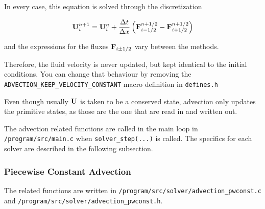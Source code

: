 In every case, this equation is solved through the discretization

\begin{equation}
	\mathbf{U}_i^{n+1} = \mathbf{U}_i^n + \frac{\Delta t}{\Delta x} \left( \mathbf{F}_{i - 1/2}^{n+1/2} - \mathbf{F}_{i + 1/2}^{n+1/2} \right) \label{eq:advection-discretized}
\end{equation}

and the expressions for the fluxes $\mathbf{F}_{i\pm1/2}$ vary between the methods.
 
Therefore, the fluid velocity is never updated, but kept identical to the initial conditions.
You can change that behaviour by removing the \verb|ADVECTION_KEEP_VELOCITY_CONSTANT| macro definition in \verb|defines.h|

Even though usually $\mathbf{U}$ is taken to be a conserved state, advection only updates the primitive states, as those are the one that are read in and written out.



The advection related functions are called in the main loop in \texttt{/program/src/main.c} when \verb|solver_step(...)| is called.
The specifics for each solver are described in the following subsection.







\subsubsection{Piecewise Constant Advection}


The related functions are written in \verb|/program/src/solver/advection_pwconst.c| and \verb|/program/src/solver/advection_pwconst.h|.

